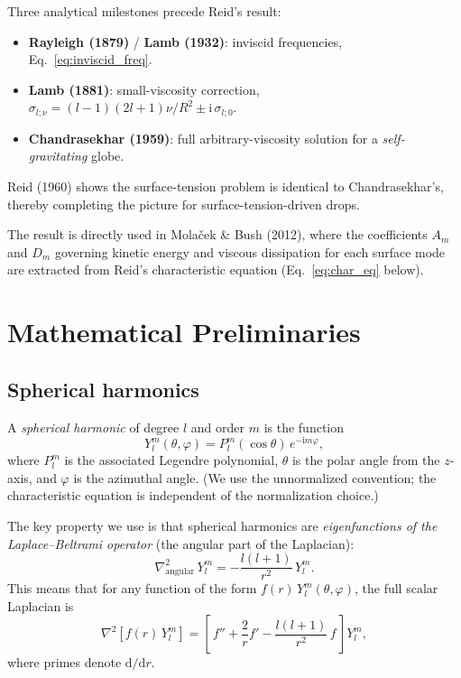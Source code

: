 \documentclass[12pt]{article}
\newcommand{\dd}{\mathrm{d}}
\newcommand{\ii}{\mathrm{i}}
\theoremstyle{definition}
\begin{document}
Three analytical milestones precede Reid's result:
\begin{itemize}
  \item \textbf{Rayleigh (1879)} / \textbf{Lamb (1932)}: inviscid frequencies, Eq.~\eqref{eq:inviscid_freq}.
  \item \textbf{Lamb (1881)}: small-viscosity correction,
        $\sigma_{l;\nu} = (l-1)(2l+1)\nu/R^2 \pm \ii\,\sigma_{l;0}$.
  \item \textbf{Chandrasekhar (1959)}: full arbitrary-viscosity solution for a
        \emph{self-gravitating} globe.
\end{itemize}
Reid (1960) shows the surface-tension problem is identical to Chandrasekhar's,
thereby completing the picture for surface-tension-driven drops.

The result is directly used in Mola\v{c}ek \& Bush (2012), where the coefficients
$A_m$ and $D_m$ governing kinetic energy and viscous dissipation for each surface mode
are extracted from Reid's characteristic equation (Eq.~\eqref{eq:char_eq} below).

\section{Mathematical Preliminaries}

\subsection{Spherical harmonics}

A \emph{spherical harmonic} of degree $l$ and order $m$ is the function
\begin{equation}
  Y_l^m(\theta,\varphi) = P_l^m(\cos\theta)\,e^{-\ii m\varphi},
  \label{eq:sph_harm}
\end{equation}
where $P_l^m$ is the associated Legendre polynomial, $\theta$ is the polar angle from
the $z$-axis, and $\varphi$ is the azimuthal angle. (We use the unnormalized convention;
the characteristic equation is independent of the normalization choice.)

The key property we use is that spherical harmonics are \emph{eigenfunctions of the
Laplace--Beltrami operator} (the angular part of the Laplacian):
\begin{equation}
  \nabla^2_{\text{angular}}\,Y_l^m
  = -\frac{l(l+1)}{r^2}\,Y_l^m.
  \label{eq:sph_harm_eigen}
\end{equation}
This means that for any function of the form $f(r)\,Y_l^m(\theta,\varphi)$, the full
scalar Laplacian is
\begin{equation}
  \nabla^2\!\left[f(r)\,Y_l^m\right]
  = \left[\,f'' + \frac{2}{r}f' - \frac{l(l+1)}{r^2}\,f\,\right] Y_l^m,
  \label{eq:scalar_lap}
\end{equation}
where primes denote $\dd/\dd r$.
\end{document}
